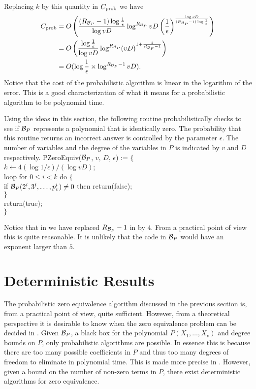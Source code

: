 Replacing $k$ by this quantity in $C_{\rm prob}$ we have
\[
\begin{aligned}
C_{\rm prob} &= 
O\left({({R_{{\cal B}_P}}-1) \log {1\over \epsilon} \over \log vD}
 \log^{R_{{\cal B}_P}} {vD \left({1 \over
\epsilon}\right)^{ \log vD \over ({R_{{\cal B}_P}}-1) \log {1\over \epsilon}}}\right)
\\
& = O\left({\log {1 \over \epsilon} \over \log vD} 
  \log^{R_{{\cal B}_P}}  (vD)^{1+{1\over {R_{{\cal B}_P}}-1}}\right)\\
& = O(\log {1 \over \epsilon} \times \log^{{R_{{\cal B}_P}}-1} vD).
\end{aligned}
\]
Notice that the cost of the probabilistic algorithm is linear in the
logarithm of the error.  This is a good characterization of what it
means for a probabilistic algorithm to be polynomial time.

\medskip
Using the ideas in this section, the following routine
probabilistically checks to see if ${\cal B}_P$ represents a polynomial
that is identically zero.  The probability that this routine returns
an incorrect answer is controlled by the parameter $\epsilon$.  The
number of variables and the degree of the variables in $P$ is
indicated by $v$ and $D$ respectively.
\begindsacode
PZeroEquiv(${\cal B}_P$, $v$, $D$, $\epsilon$) := $\{$\\
\> $k \leftarrow  4 (\log 1/\epsilon)/(\log vD)$; \\
\> loo\=p for $0 \le i < k$ do \{ \\
\>\> if ${\cal B}_P(2^i, 3^i, \ldots, p_v^i) \not=0$ then return(false); \\
\>\> $\}$\\
\> return(true);\\
\> $\}$
\enddsacode

\noindent
Notice that in  we have replaced $R_{{\cal B}_P} - 1$ in
 by $4$.  From a practical point of view this is
quite reasonable.  It is unlikely that the code in ${\cal B}_P$ would
have an exponent larger than $5$.

\section{Deterministic Results}
\label{Zero:Deterministic:Sec}

The probabilistic zero equivalence algorithm discussed in the previous
section is, from a practical point of view, quite sufficient.  However,
from a theoretical perspective it is desirable to know when the zero 
equivalence problem can be decided in .  Given ${\cal B}_P$, a black box for the polynomial 
$P(X_1, \ldots, X_v)$ and degree bounds on $P$, only probabilistic 
algorithms are possible.  In essence this is because there are too many 
possible coefficients in $P$ and thus too many degrees of freedom to 
eliminate in polynomial time.  This is made more precise in 
.  However, given a bound on the number of 
non-zero terms in $P$, there exist deterministic algorithms for zero 
equivalence. 

